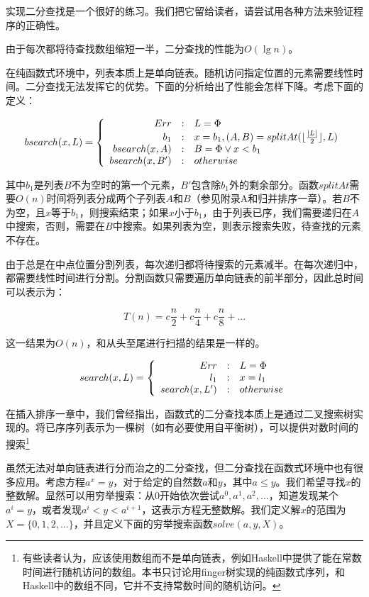 \documentclass[UTF8]{article}
\begin{document}
实现二分查找是一个很好的练习。我们把它留给读者，请尝试用各种方法来验证程序的正确性。

由于每次都将待查找数组缩短一半，二分查找的性能为$O(\lg n)$。

在纯函数式环境中，列表本质上是单向链表。随机访问指定位置的元素需要线性时间。二分查找无法发挥它的优势。下面的分析给出了性能会怎样下降。考虑下面的定义：

\[
bsearch(x, L) = \left \{
  \begin{array}
  {r@{\quad:\quad}l}
  Err & L = \Phi \\
  b_1 & x = b_1, (A, B) = splitAt(\lfloor \frac{|L|}{2} \rfloor, L) \\
  bsearch(x, A) & B = \Phi \lor x < b_1 \\
  bsearch(x, B') & otherwise
  \end{array}
\right.
\]

其中$b_1$是列表$B$不为空时的第一个元素，$B'$包含除$b_1$外的剩余部分。函数$splitAt$需要$O(n)$时间将列表分成两个子列表$A$和$B$（参见附录A和归并排序一章）。若$B$不为空，且$x$等于$b_1$，则搜索结束；如果$x$小于$b_1$，由于列表已序，我们需要递归在$A$中搜索，否则，需要在$B$中搜索。如果列表为空，则表示搜索失败，待查找的元素不存在。

由于总是在中点位置分割列表，每次递归都将待搜索的元素减半。在每次递归中，都需要线性时间进行分割。分割函数只需要遍历单向链表的前半部分，因此总时间可以表示为：

\[
T(n) = c \frac{n}{2} + c \frac{n}{4} + c \frac{n}{8} + ...
\]

这一结果为$O(n)$，和从头至尾进行扫描的结果是一样的。

\[
search(x, L) = \left \{
  \begin{array}
  {r@{\quad:\quad}l}
  Err & L = \Phi \\
  l_1 & x = l_1 \\
  search(x, L') & otherwise
  \end{array}
\right.
\]

在插入排序一章中，我们曾经指出，函数式的二分查找本质上是通过二叉搜索树实现的。将已序序列表示为一棵树（如有必要使用自平衡树），可以提供对数时间的搜索\footnote{有些读者认为，应该使用数组而不是单向链表，例如Haskell中提供了能在常数时间进行随机访问的数组。本书只讨论用finger树实现的纯函数式序列，和Haskell中的数组不同，它并不支持常数时间的随机访问。}

虽然无法对单向链表进行分而治之的二分查找，但二分查找在函数式环境中也有很多应用。考虑方程$a^x = y$，对于给定的自然数$a$和$y$，其中$a \leq y$。我们希望寻找$x$的整数解。显然可以用穷举搜索：从0开始依次尝试$a^0, a^1, a^2, ...$，知道发现某个$a^i = y$，或者发现$a^i < y < a^{i+1}$，这表示方程无整数解。我们定义解$x$的范围为$X = \{0, 1, 2, ...\}$，并且定义下面的穷举搜索函数$solve(a, y, X)$。
\end{document}

